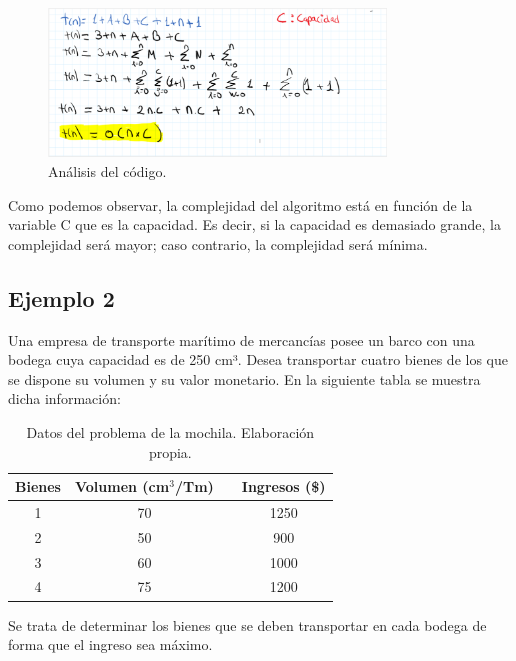 \begin{figure}[H]
    \centering
    \includegraphics[width=0.8\textwidth]{complejidad_mochila_ejem1_2.png}
    \caption{Análisis del código.}
    \label{fig:complejidad_ejemplo1_2}
\end{figure}

Como podemos observar, la complejidad del algoritmo está en función de la variable C que es la capacidad. Es decir, si la capacidad es demasiado grande, la complejidad será mayor; caso contrario, la complejidad será mínima.

\subsection{Ejemplo 2}
Una empresa de transporte marítimo de mercancías posee un barco con una bodega cuya capacidad es de 250 cm³. Desea transportar cuatro bienes de los que se dispone su volumen y su valor monetario. En la siguiente tabla se muestra dicha información:

\begin{table}[H]
    \centering
    \begin{tabular}{cccc}
        \toprule
        \textbf{Bienes} & \textbf{Volumen (cm\(^3\)/Tm)} & & \textbf{Ingresos (\$)} \\
        \midrule
        1 & 70 & & 1250 \\
        2 & 50 & & 900 \\
        3 & 60 & & 1000 \\
        4 & 75 & & 1200 \\
        \bottomrule
    \end{tabular}
    \caption{Datos del problema de la mochila. Elaboración propia.}
    \label{tab:datos_problema}
\end{table}

Se trata de determinar los bienes que se deben transportar en cada bodega de forma que el ingreso sea máximo.

